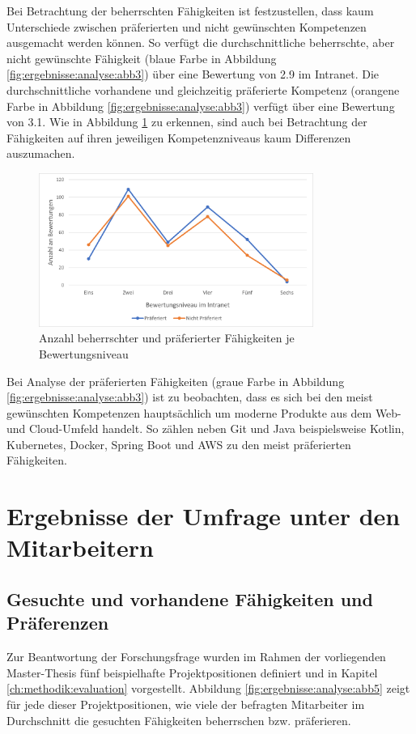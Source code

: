 Bei Betrachtung der beherrschten Fähigkeiten ist festzustellen, dass kaum Unterschiede zwischen präferierten und nicht gewünschten Kompetenzen ausgemacht werden können. So verfügt die durchschnittliche beherrschte, aber nicht gewünschte Fähigkeit (blaue Farbe in Abbildung \ref{fig:ergebnisse:analyse:abb3}) über eine Bewertung von 2.9 im Intranet. Die durchschnittliche vorhandene und gleichzeitig präferierte Kompetenz (orangene Farbe in Abbildung \ref{fig:ergebnisse:analyse:abb3}) verfügt über eine Bewertung von 3.1. Wie in Abbildung \ref{fig:ergebnisse:analyse:abb4} zu erkennen, sind auch bei Betrachtung der Fähigkeiten auf ihren jeweiligen Kompetenzniveaus kaum Differenzen auszumachen.

\begin{figure}[h]
	\centering
	\includegraphics[width=0.8\textwidth]{gfx/bewertungen-je-bewertungsniveau.png}
	\caption{Anzahl beherrschter und präferierter Fähigkeiten je Bewertungsniveau}
	\label{fig:ergebnisse:analyse:abb4}
\end{figure}

Bei Analyse der präferierten Fähigkeiten (graue Farbe in Abbildung \ref{fig:ergebnisse:analyse:abb3}) ist zu beobachten, dass es sich bei den meist gewünschten Kompetenzen hauptsächlich um moderne Produkte aus dem Web- und Cloud-Umfeld handelt. So zählen neben Git und Java beispielsweise Kotlin, Kubernetes, Docker, Spring Boot und AWS zu den meist präferierten Fähigkeiten.

\section{Ergebnisse der Umfrage unter den Mitarbeitern}
\label{ch:ergebnisse:umfrageMitarbeiter}

\subsection{Gesuchte und vorhandene Fähigkeiten und Präferenzen}
\label{ch:ergebnisse:umfrageMitarbeiter:projekte}
Zur Beantwortung der Forschungsfrage wurden im Rahmen der vorliegenden Master-Thesis fünf beispielhafte Projektpositionen definiert und in Kapitel \ref{ch:methodik:evaluation} vorgestellt. Abbildung \ref{fig:ergebnisse:analyse:abb5} zeigt für jede dieser Projektpositionen, wie viele der befragten Mitarbeiter im Durchschnitt die gesuchten Fähigkeiten beherrschen bzw. präferieren.

